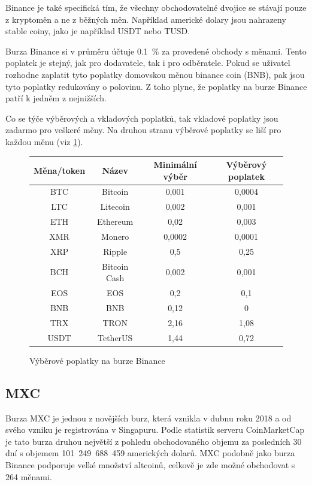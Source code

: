\documentclass[thesis=B,czech]{FITthesis}[2019/03/21]
\begin{document}
Binance je také specifická tím, že všechny obchodovatelné dvojice se stávají pouze z kryptoměn a ne z běžných měn. Například americké dolary jsou nahrazeny stable coiny, jako je například USDT nebo TUSD. 

Burza Binance si v průměru účtuje 0.1~\% za provedené obchody s měnami. Tento poplatek je stejný, jak pro dodavatele, tak i pro odběratele. Pokud se uživatel rozhodne zaplatit tyto poplatky domovskou měnou binance coin (BNB), pak jsou tyto poplatky redukovány o polovinu. Z toho plyne, že poplatky na burze Binance patří k jedněm z nejnižších.

Co se týče výběrových a vkladových poplatků, tak vkladové poplatky jsou zadarmo pro veškeré měny. Na druhou stranu výběrové poplatky se liší pro každou měnu (viz \ref{binance_fees}). \cite{blockonomi_binance}

\begin{figure}\centering
    \begin{center}
     \begin{tabular}{||c | c | c | c||} 
     \hline
     Měna/token & Název & Minimální výběr & Výběrový poplatek \\ [0.5ex] 
     \hline\hline
     BTC & Bitcoin & 0,001 & 0,0004 \\ 
     \hline
     LTC & Litecoin & 0,002 & 0,001 \\
     \hline
     ETH & Ethereum & 0,02 & 0,003 \\
     \hline
     XMR & Monero & 0,0002 & 0,0001 \\
     \hline
     XRP & Ripple & 0,5 & 0,25 \\
     \hline
     BCH & Bitcoin Cash & 0,002 & 0,001 \\
     \hline
     EOS & EOS & 0,2 & 0,1 \\
     \hline
     BNB & BNB & 0,12 & 0 \\
     \hline
     TRX & TRON & 2,16 & 1,08 \\
     \hline
     USDT & TetherUS & 1,44 & 0,72 \\ [1ex] 
     \hline
    \end{tabular}
    \end{center}
    \caption{Výběrové poplatky na burze Binance \cite{binance_fees}}
    \label{binance_fees}
\end{figure}
\subsection{MXC}
Burza MXC je jednou z novějších burz, která vznikla v dubnu roku 2018 a od svého vzniku je registrována v Singapuru. Podle statistik serveru CoinMarketCap je tato burza druhou největší z pohledu obchodovaného objemu za posledních 30 dní s objemem 101~249~688~459 amerických dolarů. \cite{coinmarketcap} MXC podobně jako burza Binance podporuje velké množství altcoinů, celkově je zde možné obchodovat s 264 měnami. \cite{mxc_coins}
\end{document}
